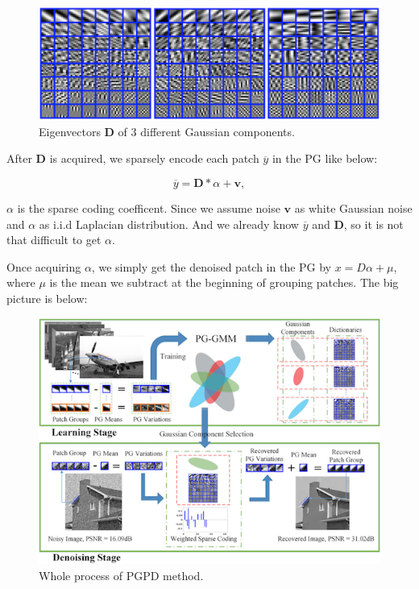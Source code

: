  \begin{figure}[H]
 	\centering
	\includegraphics[width=.9\linewidth]{Figures/theory_pgpd/PG_eigenvector.jpg}
 	\caption{Eigenvectors $\textbf{D}$ of 3 different Gaussian components.}
 	\label{fig:eigen}
 \end{figure}
 
After \textbf{D} is acquired, we sparsely encode each patch $\overline{y}$ in the PG like below:

\begin{equation}
	\overline{y} = \textbf{D}* \alpha + \textbf{v},
	\label{eq:pgpd_2}
\end{equation}

$\alpha$ is the sparse coding coefficent. Since we assume noise $\textbf{v}$ as white Gaussian noise and $\alpha$ as i.i.d Laplacian distribution. And we already know $\overline{y}$ and $\textbf{D}$, so it is not that difficult to get $\alpha$.

Once acquiring $\alpha$, we simply get the denoised patch in the PG by $x = D\alpha + \mu$, where $\mu$ is the mean we subtract at the beginning of grouping patches. The big picture is below:

 \begin{figure}[H]
 	\centering
	\includegraphics[width=\linewidth]{Figures/theory_pgpd/big_picture.jpg}
 	\caption{Whole process of PGPD method.}
 	\label{fig:subtract_pgpd}
 \end{figure}